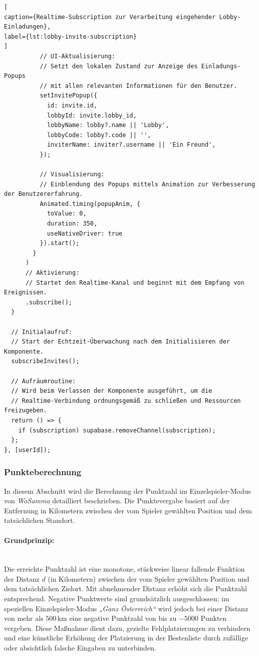 \begin{lstlisting}[
caption={Realtime-Subscription zur Verarbeitung eingehender Lobby-Einladungen},
label={lst:lobby-invite-subscription}
]
          // UI-Aktualisierung:
          // Setzt den lokalen Zustand zur Anzeige des Einladungs-Popups
          // mit allen relevanten Informationen für den Benutzer.
          setInvitePopup({
            id: invite.id,
            lobbyId: invite.lobby_id,
            lobbyName: lobby?.name || 'Lobby',
            lobbyCode: lobby?.code || '',
            inviterName: inviter?.username || 'Ein Freund',
          });

          // Visualisierung:
          // Einblendung des Popups mittels Animation zur Verbesserung der Benutzererfahrung.
          Animated.timing(popupAnim, {
            toValue: 0,
            duration: 350,
            useNativeDriver: true
          }).start();
        }
      )
      // Aktivierung:
      // Startet den Realtime-Kanal und beginnt mit dem Empfang von Ereignissen.
      .subscribe();
  }

  // Initialaufruf:
  // Start der Echtzeit-Überwachung nach dem Initialisieren der Komponente.
  subscribeInvites();

  // Aufräumroutine:
  // Wird beim Verlassen der Komponente ausgeführt, um die
  // Realtime-Verbindung ordnungsgemäß zu schließen und Ressourcen freizugeben.
  return () => {
    if (subscription) supabase.removeChannel(subscription);
  };
}, [userId]);
\end{lstlisting}
\subsubsection{Punkteberechnung}

In diesem Abschnitt wird die Berechnung der Punktzahl im Einzelspieler-Modus von \textit{WoSamma} detailliert beschrieben. 
Die Punktevergabe basiert auf der Entfernung in Kilometern zwischen der vom Spieler gewählten Position und dem tatsächlichen Standort.

\paragraph{Grundprinzip: }
\mbox{}\\
Die erreichte Punktzahl ist eine monotone, stückweise linear fallende Funktion der Distanz $d$ (in Kilometern) zwischen der vom Spieler gewählten Position und dem tatsächlichen Zielort. 
Mit abnehmender Distanz erhöht sich die Punktzahl entsprechend. 
Negative Punktwerte sind grundsätzlich ausgeschlossen; im speziellen Einzelspieler-Modus \emph{„Ganz Österreich“} wird jedoch bei einer Distanz von mehr als $500\,\text{km}$ eine negative Punktzahl von bis zu $-5000$ Punkten vergeben. 
Diese Maßnahme dient dazu, gezielte Fehlplatzierungen zu verhindern und eine künstliche Erhöhung der Platzierung in der Bestenliste durch zufällige oder absichtlich falsche Eingaben zu unterbinden.

